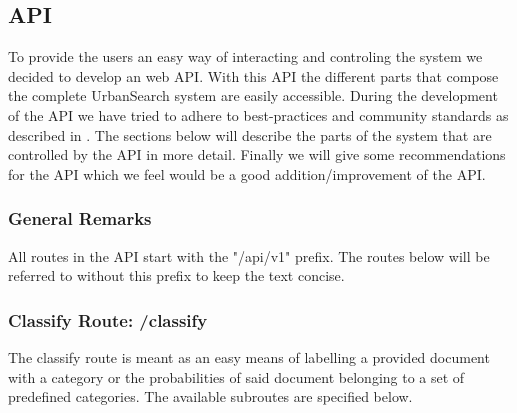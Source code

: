 \subsection{API}
To provide the users an easy way of interacting and controling the system we decided to develop an web API. With this API the different parts that compose the complete UrbanSearch system are easily accessible. During the development of the API we have tried to adhere to best-practices and community standards as described in \cite{apigee}. The sections below will describe the parts of the system that are controlled by the API in more detail. Finally we will give some recommendations for the API which we feel would be a good addition/improvement of the API.

\subsubsection{General Remarks}

All routes in the API start with the "/api/v1" prefix. The routes below will be referred to without this prefix to keep the text concise.

\subsubsection{Classify Route: /classify}
The classify route is meant as an easy means of labelling a provided document with a category or the probabilities of said document belonging to a set of predefined categories.
The available subroutes are specified below.

